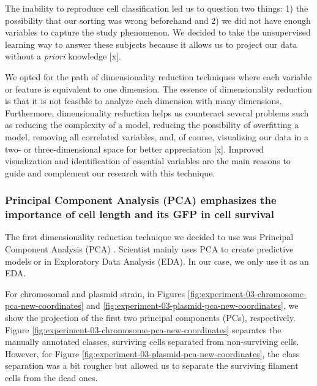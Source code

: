 \documentclass[
  12pt,
  a4paper,
  oneside]{krantz}
\begin{document}
The inability to reproduce cell classification led us to question two
things: 1) the possibility that our sorting was wrong beforehand and 2)
we did not have enough variables to capture the study phenomenon. We
decided to take the unsupervised learning way to answer these subjects
because it allows us to project our data without a \emph{priori} knowledge
{[}x{]}.

We opted for the path of dimensionality reduction techniques where each
variable or feature is equivalent to one dimension. The essence of
dimensionality reduction is that it is not feasible to analyze each
dimension with many dimensions. Furthermore, dimensionality reduction
helps us counteract several problems such as reducing the complexity of
a model, reducing the possibility of overfitting a model, removing all
correlated variables, and, of course, visualizing our data in a two- or
three-dimensional space for better appreciation {[}x{]}. Improved
visualization and identification of essential variables are the main
reasons to guide and complement our research with this technique.

\hypertarget{principal-component-analysis-pca-emphasizes-the-importance-of-cell-length-and-its-gfp-in-cell-survival}{%
\subsubsection{Principal Component Analysis (PCA) emphasizes the importance of cell length and its GFP in cell survival}\label{principal-component-analysis-pca-emphasizes-the-importance-of-cell-length-and-its-gfp-in-cell-survival}}

The first dimensionality reduction technique we decided to use was
Principal Component Analysis (PCA) \citep{pearson1901, hotelling1936}.
Scientist mainly uses PCA to create predictive models or in Exploratory
Data Analysis (EDA). In our case, we only use it as an EDA.

For chromosomal and plasmid strain, in Figures
\ref{fig:experiment-03-chromosome-pca-new-coordinates} and
\ref{fig:experiment-03-plasmid-pca-new-coordinates}, we show the
projection of the first two principal components (PCs), respectively.
Figure \ref{fig:experiment-03-chromosome-pca-new-coordinates} separates
the manually annotated classes, surviving cells separated from
non-surviving cells. However, for Figure
\ref{fig:experiment-03-plasmid-pca-new-coordinates}, the class
separation was a bit rougher but allowed us to separate the surviving
filament cells from the dead ones.
\end{document}
